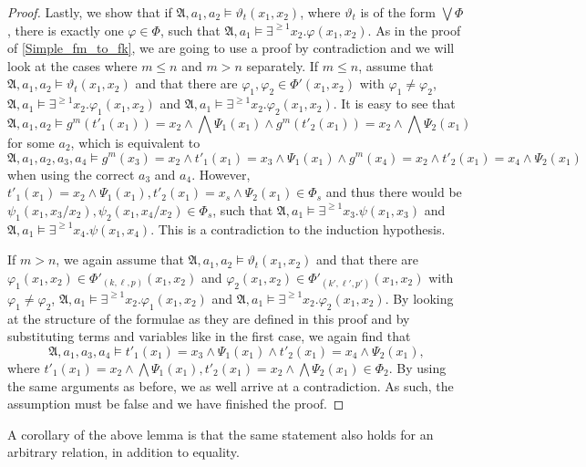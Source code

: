 \documentclass[a4paper,11pt,DIV=15]{scrartcl} %
\renewcommand{\phi}{\varphi}
\theoremstyle{plain}
\theoremstyle{definition}
\renewcommand{\theta}{\vartheta}
\begin{document}
\begin{proof}
	Lastly, we show that if $\mathfrak A,a_1,a_2\models \theta_t(x_1,x_2)$, where $\theta_t$ is of the form $\bigvee \Phi$, there is exactly one $\phi\in\Phi$, such that $\mathfrak A,a_1\models \exists^{\geq 1} x_2.\phi(x_1,x_2)$.
	As in the proof of \cref{Simple_fm_to_fk}, we are going to use a proof by contradiction and we will look at the cases where $m\leq n$ and $m> n$ separately.
	If $m\leq n$, assume that $\mathfrak A,a_1,a_2\models \theta_t(x_1,x_2)$ and that there are $\phi_1,\phi_2\in \Phi'(x_1,x_2)$ with $\phi_1\neq \phi_2$, $\mathfrak A,a_1\models \exists^{\geq 1}x_2.\phi_1(x_1,x_2)$ and $\mathfrak A,a_1\models \exists^{\geq 1}x_2.\phi_2(x_1,x_2)$.
	It is easy to see that 
	$$\mathfrak A,a_1,a_2\models g^m(t'_1(x_1))=x_2 \land \bigwedge \Psi_1(x_1) \land g^m(t'_2(x_1))=x_2 \land \bigwedge\Psi_2(x_1)$$
	for some $a_2$, which is equivalent to
	$$\mathfrak A,a_1,a_2,a_3,a_4\models g^m(x_3)=x_2 \land t'_1(x_1)=x_3\land \Psi_1(x_1) \land g^m(x_4)=x_2 \land t'_2(x_1)=x_4 \land \Psi_2(x_1)$$
	when using the correct $a_3$ and $a_4$.
	However, $t'_1(x_1)=x_2\land \Psi_1(x_1), t'_2(x_1)=x_s \land \Psi_2(x_1) \in \Phi_s$ and thus there would be $\psi_1(x_1,x_3/x_2),\psi_2(x_1,x_4/x_2) \in \Phi_s$, such that $\mathfrak A,a_1\models \exists^{\geq 1}x_3. \psi(x_1,x_3)$ and $\mathfrak A,a_1\models \exists^{\geq 1}x_4.\psi(x_1,x_4)$.
	This is a contradiction to the induction hypothesis.
	
	If $m>n$, we again assume that $\mathfrak A,a_1,a_2\models \theta_t(x_1,x_2)$ and that there are $\phi_1(x_1,x_2)\in\Phi'_{(k,\ell,p)}(x_1,x_2)$ and $\phi_2(x_1,x_2)\in\Phi'_{(k',\ell',p')}(x_1,x_2)$ with $\phi_1\neq \phi_2$, $\mathfrak A,a_1\models \exists^{\geq 1}x_2.\phi_1(x_1,x_2)$ and $\mathfrak A,a_1\models \exists^{\geq 1}x_2.\phi_2(x_1,x_2)$.
	By looking at the structure of the formulae as they are defined in this proof and by substituting terms and variables like in the first case, we again find that 
	$$\mathfrak A,a_1,a_3,a_4\models t'_1(x_1)=x_3\land \Psi_1(x_1) \land t'_2(x_1)=x_4 \land \Psi_2(x_1),$$
	where $t'_1(x_1)=x_2\land\bigwedge \Psi_1(x_1), t'_2(x_1)=x_2\land\bigwedge \Psi_2(x_1)\in \Phi_2$.
	By using the same arguments as before, we as well arrive at a contradiction.
	As such, the assumption must be false and we have finished the proof.
\end{proof}

A corollary of the above lemma is that the same statement also holds for an arbitrary relation, in addition to equality.
\end{document}
